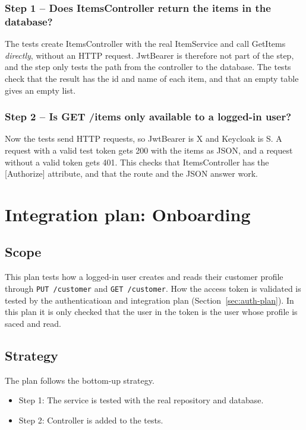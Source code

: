 \documentclass[a4paper,11pt]{article}
\begin{document}
\subsubsection*{Step 1 -- Does ItemsController return the items in the database?}
The tests create ItemsController with the real ItemService and call GetItems \textit{directly}, without an HTTP request.
JwtBearer is therefore not part of the step, and the step only tests the path from the controller to the database.
The tests check that the result has the id and name of each item, and that an empty table gives an empty list.

\subsubsection*{Step 2 -- Is GET /items only available to a logged-in user?}
Now the tests send HTTP requests, so JwtBearer is X and Keycloak is S. A request with a valid test token gets 200 with the items as JSON, and a request without a valid token gets 401. This checks that ItemsController has the [Authorize] attribute, and that the route and the JSON answer work.

\section{Integration plan: Onboarding}
\subsection{Scope}
This plan tests how a logged-in user creates and reads their customer profile through \texttt{PUT /customer} and \texttt{GET /customer}. 
How the access token is validated is tested by the authenticatioan and integration plan (Section~\ref{sec:auth-plan}). In this plan
 it is only checked that the user in the token is the user whose profile is saced and read.

\subsection{Strategy}
The plan follows the bottom-up strategy. 
\begin{itemize}
  \item Step 1: The service is tested with the real repository and database.
  \item Step 2: Controller is added to the tests.
\end{itemize}
\end{document}
